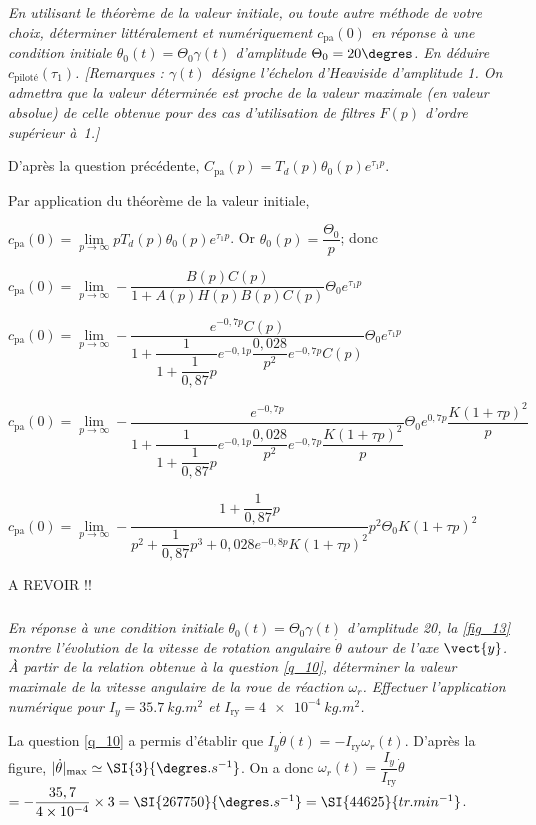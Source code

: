 \subparagraph{\label{q_25}}\textit{En utilisant le théorème de la valeur initiale,
ou toute autre méthode de votre choix, déterminer littéralement
et numériquement $c_{\text{pa}}(0)$ en réponse à une condition initiale 
$\theta_0(t)=\Theta_0 \gamma(t)$ d'amplitude $\Theta_0 = 20\degres$. En
déduire $c_{\text{piloté}}(\tau_1)$. 
[Remarques : $\gamma(t)$ désigne l’échelon d’Heaviside d’amplitude 1. On admettra que la valeur déterminée est proche de la 
valeur maximale (en valeur absolue) de celle obtenue pour des cas d’utilisation
de filtres $F(p)$ d'ordre supérieur à~1.]}
\ifprof
\begin{corrige}

D'après la question précédente,  $C_{\text{pa}}(p) = T_d(p) \theta_0(p)  e^{\tau_1 p}$.

Par application du théorème de la valeur initiale, 

$c_{\text{pa}}(0) = \lim\limits_{p \to \infty} p T_d(p) \theta_0(p)  e^{\tau_1 p} $. Or $\theta_0(p) = \dfrac{\Theta_0}{p}$; donc 

$c_{\text{pa}}(0) = \lim\limits_{p \to \infty}   -\dfrac{ B(p) C(p)}{ 1+ A(p) H(p) B(p) C(p)}  \Theta_0  e^{\tau_1 p}  $

$c_{\text{pa}}(0) = \lim\limits_{p \to \infty}   -\dfrac{e^{-0,7p} C(p)}{ 1+ \dfrac{1}{1+\dfrac{1}{0,87}p}e^{-0,1 p}  \dfrac{0,028}{p^2} e^{-0,7p} C(p)}  \Theta_0  e^{\tau_1 p}  $

$c_{\text{pa}}(0) = \lim\limits_{p \to \infty}   -\dfrac{e^{-0,7p}}{ 1+ \dfrac{1}{1+\dfrac{1}{0,87}p}e^{-0,1 p}  \dfrac{0,028}{p^2} e^{-0,7p} \dfrac{K(1+\tau p)^2}{p}}  \Theta_0  e^{0,7 p}   \dfrac{K(1+\tau p)^2}{p}$

$c_{\text{pa}}(0) = \lim\limits_{p \to \infty}   -\dfrac{ 1+\dfrac{1}{0,87}p}{p^2+\dfrac{1}{0,87}p^3+  0,028 e^{-0,8p} K(1+\tau p)^2}   p^2\Theta_0  K(1+\tau p)^2  $


A REVOIR !!



\end{corrige}
\else
\fi

\subparagraph{\label{q_26}}\textit{En réponse à une condition initiale  $\theta_0(t)=\Theta_0 \gamma(t)$ d’amplitude 20\degres, 
la \autoref{fig_13} montre l’évolution de la vitesse de rotation angulaire $\dot{\theta}$
autour de l’axe $\vect{y}$. À partir de la relation obtenue à la question \ref{q_10}, déterminer
la valeur maximale de la vitesse angulaire de la roue de réaction $\omega_r$.
Effectuer l’application numérique pour
$I_y = \SI{35,7}{kg.m^2}$ et $I_{\text{ry}}=\SI{4e-4}{kg.m^2}$.}
\ifprof
\begin{corrige}
La question \ref{q_10} a permis d'établir que $I_y \dot{\theta}(t)=-I_{\text{ry}}\omega_r(t)$. D'après la figure, $| \dot{\theta}|_{\text{max}} \simeq \SI{3}{\degres.s^{-1}}$. 
On a donc $\omega_r(t) =  \dfrac{I_y}{I_{\text{ry}}} \dot{\theta}$ $=- \dfrac{35,7}{4\times 10^{-4}} \times 3 = \SI{267750}{\degres.s^{-1}} = \SI{44625}{tr.min^{-1}}$.
\end{corrige}
\else
\fi

